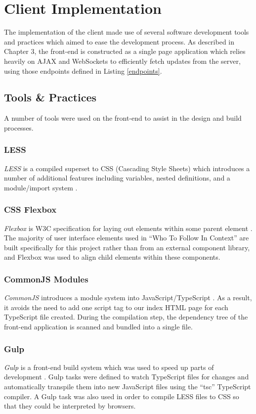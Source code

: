 \documentclass{l4proj}
\begin{document}
                          
\section{Client Implementation}
The implementation of the client made use of several software development tools and practices which aimed to ease the development process. As described in Chapter 3, the front-end is constructed as a single page application which relies heavily on AJAX and WebSockets to efficiently fetch updates from the server, using those endpoints defined in Listing \ref{endpoints}.

        \subsection{Tools \& Practices}
        A number of tools were used on the front-end to assist in the design and build processes.
           
        \subsubsection{LESS}
        \textit{LESS} is a compiled superset to CSS (Cascading Style Sheets) which introduces a number of additional features including variables, nested definitions, and a module/import system \cite{less}.
        
        \subsubsection{CSS Flexbox}
        \textit{Flexbox} is W3C specification for laying out elements within some parent element \cite{flexbox}. The majority of user interface elements used in ``Who To Follow In Context'' are built specifically for this project rather than from an external component library, and Flexbox was used to align child elements within these components.

        \subsubsection{CommonJS Modules}
        \textit{CommonJS} introduces a module system into JavaScript/TypeScript \cite{commonjs}. As a result, it avoids the need to add one script tag to our index HTML page for each TypeScript file created. During the compilation step, the dependency tree of the front-end application is scanned and bundled into a single file.

        \subsubsection{Gulp}
        \textit{Gulp} is a front-end build system which was used to speed up parts of development \cite{gulp}. Gulp tasks were defined to watch TypeScript files for changes and automatically transpile them into new JavaScript files using the ``tsc'' TypeScript compiler. A Gulp task was also used in order to compile LESS files to CSS so that they could be interpreted by browsers.
        
\end{document}
